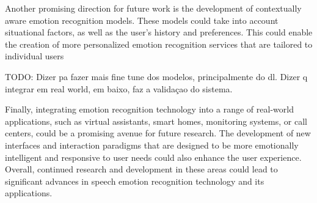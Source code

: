 Another promising direction for future work is the development of contextually aware emotion recognition models. These models could take into account situational factors, as well as the user's history and preferences. This could enable the creation of more personalized emotion recognition services that are tailored to individual users

TODO: Dizer pa fazer mais fine tune dos modelos, principalmente do dl. Dizer q integrar em real world, em baixo, faz a validaçao do sistema.

Finally, integrating emotion recognition technology into a range of real-world applications, such as virtual assistants, smart homes, monitoring systems, or call centers, could be a promising avenue for future research. The development of new interfaces and interaction paradigms that are designed to be more emotionally intelligent and responsive to user needs could also enhance the user experience. Overall, continued research and development in these areas could lead to significant advances in speech emotion recognition technology and its applications.